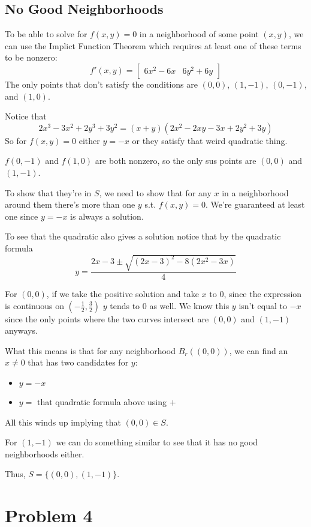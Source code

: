 \documentclass[12pt]{article}
\begin{document}
\pagebreak

\subsection{No Good Neighborhoods}

To be able to solve for $f(x, y)=0$ in a neighborhood of some point $(x, y)$,
we can use the Implict Function Theorem which requires at least one of these
terms to be nonzero:
\[f'(x, y)=\begin{bmatrix}
    6x^2-6x & 6y^2+6y
  \end{bmatrix}\]
The only points that don't satisfy the conditions are $(0, 0)$, $(1, -1)$, $(0, -1)$, and $(1, 0)$.

Notice that
\[2x^3-3x^2+2y^3+3y^2=(x+y)\left(2x^2-2xy-3x+2y^2+3y\right)\]
So for $f(x, y)=0$ either $y=-x$ or they satisfy that weird quadratic thing.

$f(0, -1)$ and $f(1, 0)$ are both nonzero, so the only sus points are $(0, 0)$ and $(1, -1)$.

To show that they're in $S$, we need to show that for any $x$ in a neighborhood
around them there's more than one $y$ s.t. $f(x, y)=0$.
We're guaranteed at least one since $y=-x$ is always a solution.

To see that the quadratic also gives a solution notice that by the quadratic formula
\[y=\frac{2x-3 \pm \sqrt{(2x-3)^2-8\left(2x^2-3x\right)}}{4}\]

For $(0, 0)$, if we take the positive solution and take $x$ to $0$,
since the expression is continuous on $\left(-\frac{1}{2}, \frac{3}{2}\right)$
$y$ tends to $0$ as well.
We know this $y$ isn't equal to $-x$ since the only points
where the two curves intersect are $(0, 0)$ and $(1, -1)$ anyways.

What this means is that for any neighborhood $B_r((0, 0))$,
we can find an $x \ne 0$ that has two candidates for $y$:
\begin{itemize}[nolistsep]
  \item $y=-x$
  \item $y=$ that quadratic formula above using $+$
\end{itemize}
All this winds up implying that $(0, 0) \in S$.

For $(1, -1)$ we can do something similar to see that it has no good neighborhoods either.

Thus, $S=\{(0, 0), (1, -1)\}$.

\pagebreak

\section{Problem 4}
\end{document}
